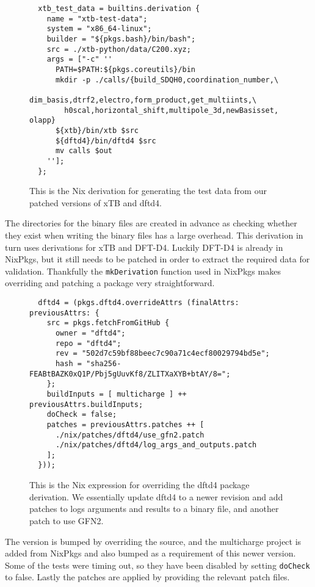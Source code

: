 \begin{figure}[H]
\begin{verbatim}
  xtb_test_data = builtins.derivation {
    name = "xtb-test-data";
    system = "x86_64-linux";
    builder = "${pkgs.bash}/bin/bash";
    src = ./xtb-python/data/C200.xyz;
    args = ["-c" ''
      PATH=$PATH:${pkgs.coreutils}/bin
      mkdir -p ./calls/{build_SDQH0,coordination_number,\
        dim_basis,dtrf2,electro,form_product,get_multiints,\
        h0scal,horizontal_shift,multipole_3d,newBasisset, olapp}
      ${xtb}/bin/xtb $src
      ${dftd4}/bin/dftd4 $src
      mv calls $out
    ''];
  };
\end{verbatim}
\caption{This is the Nix derivation for generating the test data from our patched versions of xTB and dftd4.}
\label{fig:xtb-test-data}
\end{figure}

The directories for the binary files are created in advance as checking whether they exist when writing the binary files has a large overhead.
This derivation in turn uses derivations for xTB and DFT-D4. Luckily DFT-D4 is already in NixPkgs, but it still needs to be patched in order to extract the required data for validation. Thankfully the \verb|mkDerivation| function used in NixPkgs makes overriding and patching a package very straightforward. 

\begin{figure}[H]
\begin{verbatim}
  dftd4 = (pkgs.dftd4.overrideAttrs (finalAttrs: previousAttrs: {
    src = pkgs.fetchFromGitHub {
      owner = "dftd4";
      repo = "dftd4";
      rev = "502d7c59bf88beec7c90a71c4ecf80029794bd5e";
      hash = "sha256-FEABtBAZK0xQ1P/Pbj5gUuvKf8/ZLITXaXYB+btAY/8=";
    };
    buildInputs = [ multicharge ] ++ previousAttrs.buildInputs;
    doCheck = false;
    patches = previousAttrs.patches ++ [
      ./nix/patches/dftd4/use_gfn2.patch
      ./nix/patches/dftd4/log_args_and_outputs.patch
    ];
  }));
\end{verbatim}
\caption{This is the Nix expression for overriding the dftd4 package derivation. We essentially update dftd4 to a newer revision and add patches to logs arguments and results to a binary file, and another patch to use GFN2.}
\label{fig:dftf4-drv}
\end{figure}

The version is bumped by overriding the source, and the multicharge project is added from NixPkgs and also bumped as a requirement of this newer version. Some of the tests were timing out, so they have been disabled by setting \verb|doCheck| to false. Lastly the patches are applied by providing the relevant patch files.

